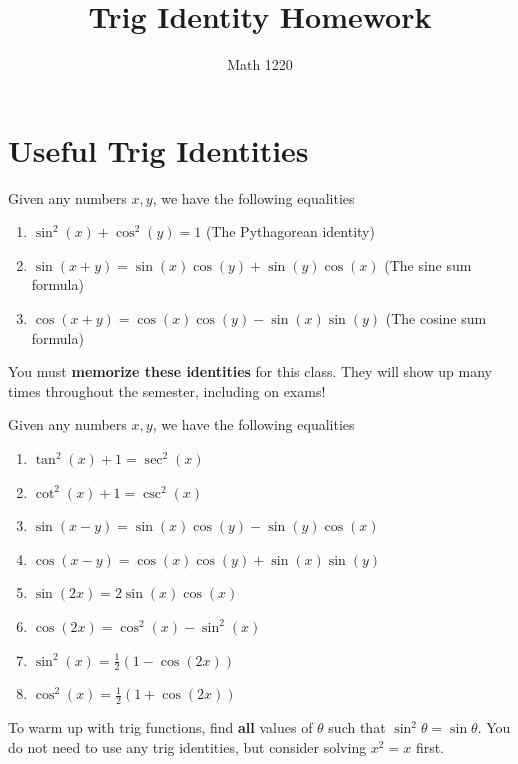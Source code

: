 \documentclass[12pt, a4paper]{article}
\author{Math 1220}
\title{Trig Identity Homework}
\date{}
\begin{document}
\maketitle
\nameline
\section{Useful Trig Identities}
\begin{thrm}
  Given any numbers \(x,y\), we have the following equalities
  \begin{enumerate}
  \item \(\sin^2 (x) + \cos^2 (y) = 1 \) \hspace{2.4in} \text(The Pythagorean identity)
  \item \(\sin(x+y) = \sin(x)\cos(y) + \sin(y)\cos(x)\) \hspace{1in}  (The sine
    sum formula)
  \item \(\cos(x+y) = \cos(x)\cos(y) - \sin(x)\sin(y)\)  \hspace{1in} (The cosine
    sum formula)
  \end{enumerate}
\end{thrm}
\vspace{-0.75in}
You must \textbf{memorize these identities} for this class. They will
show up many times throughout the semester, including on exams!
\begin{thrm}
  Given any numbers \(x,y\), we have the following equalities
  \begin{enumerate}
  \item \(\tan^2(x)+1 = \sec^2(x)\)
  \item \(\cot^2(x)+1 = \csc^2(x)\)
  \item \(\sin(x-y) = \sin(x)\cos(y)-\sin(y)\cos(x)\)
  \item \(\cos(x-y) = \cos(x)\cos(y)+\sin(x)\sin(y)\)
  \item \(\sin(2x) = 2\sin(x)\cos(x)\)
  \item \(\cos(2x) = \cos^2(x)-\sin^2(x)\)
  \item \(\sin^2(x) = \frac{1}{2}(1-\cos(2x))\)
  \item \(\cos^2(x) = \frac{1}{2}(1+\cos(2x))\)
  \end{enumerate}
\end{thrm}
\vspace{-1in}
\begin{ex}
  To warm up with trig functions, find \textbf{all} values of \(\theta\) such that \(\sin^2 \theta
  = \sin \theta\). You do not need to use any trig identities, but
  consider solving \(x^2=x\) first.
\end{ex}
\pagebreak
\end{document}
